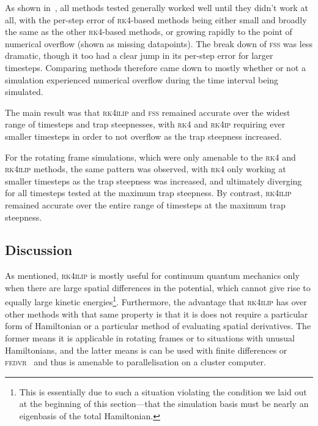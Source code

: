 As shown in~, all methods tested generally worked well until they didn't work at all, with the per-step error of \textsc{rk4}-based methods being either small and broadly the same as the other \textsc{rk4}-based methods, or growing rapidly to the point of numerical overflow (shown as missing datapoints). The break down of \textsc{fss} was less dramatic, though it too had a clear jump in its per-step error for larger timesteps. Comparing methods therefore came down to mostly whether or not a simulation experienced numerical overflow during the time interval being simulated.

The main result was that \textsc{rk4ilip} and \textsc{fss} remained accurate over the widest range of timesteps and trap steepnesses, with \textsc{rk4} and \textsc{rk4ip} requiring ever smaller timesteps in order to not overflow as the trap steepness increased.

For the rotating frame simulations, which were only amenable to the \textsc{rk4} and \textsc{rk4ilip} methods, the same pattern was observed, with \textsc{rk4} only working at smaller timesteps as the trap steepness was increased, and ultimately diverging for all timesteps tested at the maximum trap steepness. By contrast, \textsc{rk4ilip} remained accurate over the entire range of timesteps at the maximum trap steepness.

\subsection{Discussion}

As mentioned, \textsc{rk4ilip} is mostly useful for continuum quantum mechanics only when there are large spatial differences in the potential, which cannot give rise to equally large kinetic energies\footnote{This is essentially due to such a situation violating the condition we laid out at the beginning of this section---that the simulation basis must be nearly an eigenbasis of the total Hamiltonian.}. Furthermore, the advantage that \textsc{rk4ilip} has over other methods with that same property is that it is does not require a particular form of Hamiltonian or a particular method of evaluating spatial derivatives. The former means it is applicable in rotating frames or to situations with unusual Hamiltonians, and the latter means is can be used with finite differences or \textsc{fedvr}~\cite{schneider_parallel_2006} and thus is amenable to parallelisation on a cluster computer.

